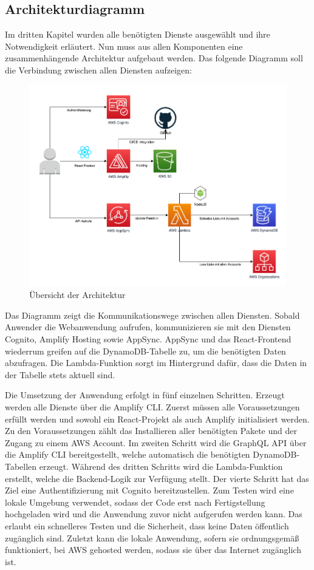 \subsection{Architekturdiagramm }

Im dritten Kapitel wurden alle benötigten Dienste ausgewählt und ihre Notwendigkeit erläutert.
Nun muss aus allen Komponenten eine zusammenhängende Architektur aufgebaut werden.
Das folgende Diagramm soll die Verbindung zwischen allen Diensten aufzeigen:

\begin{figure}[htbp]
    \centering
    \includegraphics[width=1.0\textwidth]{50-Implementierung/Architektur.png}
    \caption{Übersicht der Architektur}
    \label{fig:meine-grafik}
\end{figure}

Das Diagramm zeigt die Kommunikationswege zwischen allen Diensten.
Sobald Anwender die Webanwendung aufrufen, kommunizieren sie mit den Diensten Cognito, Amplify Hosting sowie AppSync.
AppSync und das React-Frontend wiederrum greifen auf die DynamoDB-Tabelle zu, um die benötigten Daten abzufragen.
Die Lambda-Funktion sorgt im Hintergrund dafür, dass die Daten in der Tabelle stets aktuell sind.

Die Umsetzung der Anwendung erfolgt in fünf einzelnen Schritten.
Erzeugt werden alle Dienste über die Amplify CLI.
Zuerst müssen alle Voraussetzungen erfüllt werden und sowohl ein React-Projekt als auch Amplify initialisiert werden.
Zu den Voraussetzungen zählt das Installieren aller benötigten Pakete und der Zugang zu einem AWS Account.
Im zweiten Schritt wird die GraphQL API über die Amplify CLI bereitgestellt, welche automatisch die benötigten DynamoDB-Tabellen erzeugt.
Während des dritten Schritts wird die Lambda-Funktion erstellt, welche die Backend-Logik zur Verfügung stellt.
Der vierte Schritt hat das Ziel eine Authentifizierung mit Cognito bereitzustellen.
Zum Testen wird eine lokale Umgebung verwendet, sodass der Code erst nach Fertigstellung hochgeladen wird und die Anwendung zuvor nicht aufgerufen werden kann.
Das erlaubt ein schnelleres Testen und die Sicherheit, dass keine Daten öffentlich zugänglich sind.
Zuletzt kann die lokale Anwendung, sofern sie ordnungsgemäß funktioniert, bei AWS gehosted werden, sodass sie über das Internet zugänglich ist.

